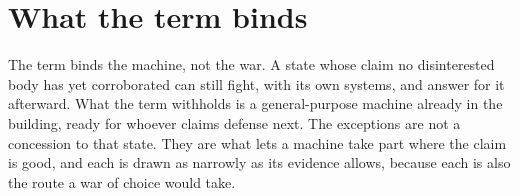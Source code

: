 \section{What the term binds}
\label{sec:6.9}
The term binds the machine, not the war. A state whose claim no disinterested body has yet corroborated can still fight, with its own systems, and answer for it afterward. What the term withholds is a general-purpose machine already in the building, ready for whoever claims defense next. The exceptions are not a concession to that state. They are what lets a machine take part where the claim is good, and each is drawn as narrowly as its evidence allows, because each is also the route a war of choice would take.
